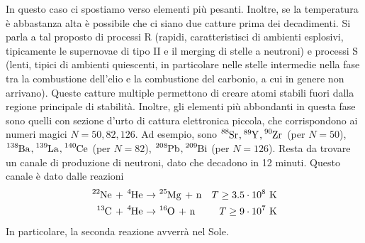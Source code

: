 \documentclass[a4paper,11pt]{article}
\theoremstyle{theorem}
\theoremstyle{definition}
\begin{document}
\begin{itemize}
		In questo caso ci spostiamo verso elementi più pesanti. Inoltre, se la temperatura è abbastanza alta è possibile che ci siano due catture prima dei decadimenti. Si parla a tal proposto di processi R (rapidi, caratteristisci di ambienti esplosivi, tipicamente le supernovae di tipo II e il merging di stelle a neutroni) e processi S (lenti, tipici di ambienti quiescenti, in particolare nelle stelle intermedie nella fase tra la combustione dell'elio e la combustione del carbonio, a cui in genere non arrivano). Queste catture multiple permettono di creare atomi stabili fuori dalla regione principale di stabilità. Inoltre, gli elementi più abbondanti in questa fase sono quelli con sezione d'urto di cattura elettronica piccola, che corrispondono ai numeri magici $N=50,82,126$. Ad esempio, sono $\tensor[^{88}]{\mathrm{Sr}}{},\tensor[^{89}]{\mathrm{Y}}{},\tensor[^{90}]{\mathrm{Zr}}{}$ (per $N=50$), $\tensor[^{138}]{\mathrm{Ba}}{},\tensor[^{139}]{\mathrm{La}}{},\tensor[^{140}]{\mathrm{Ce}}{}$ (per $N=82$), $\tensor[^{208}]{\mathrm{Pb}}{},\tensor[^{209}]{\mathrm{Bi}}{}$ (per $N=126$). Resta da trovare un canale di produzione di neutroni, dato che decadono in 12 minuti. Questo canale è dato dalle reazioni
		\begin{align*}
			\tensor[^{22}]{\mathrm{Ne}}{}\textrm{ + }\tensor[^{4}]{\mathrm{He}}{}&\rightarrow\tensor[^{25}]{\mathrm{Mg}}{}\textrm{ + n}&T\geq 3.5\cdot10^8\textrm{ K}\\
			\tensor[^{13}]{\mathrm{C}}{}\textrm{ + }\tensor[^{4}]{\mathrm{He}}{}&\rightarrow\tensor[^{16}]{\mathrm{O}}{}\textrm{ + n}&T\geq 9\cdot10^7\textrm{ K}
		\end{align*}
		In particolare, la seconda reazione avverrà nel Sole.
		
		\noindent	
		

\end{itemize}
\end{document}
